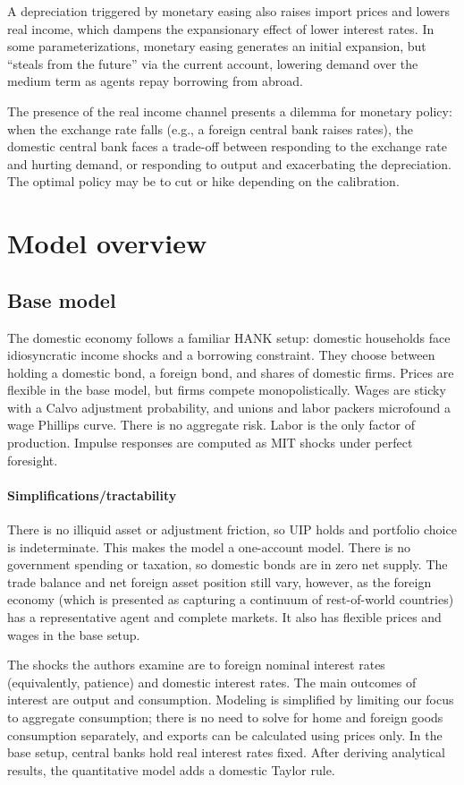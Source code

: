 \documentclass[12pt]{article}
\begin{document}
A depreciation triggered by monetary easing also raises import prices and lowers real income, which dampens the expansionary effect of lower interest rates. In some parameterizations, monetary easing generates an initial expansion, but \enquote{steals from the future} via the current account, lowering demand over the medium term as agents repay borrowing from abroad.

The presence of the real income channel presents a dilemma for monetary policy: when the exchange rate falls (e.g., a foreign central bank raises rates), the domestic central bank faces a trade-off between responding to the exchange rate and hurting demand, or responding to output and exacerbating the depreciation. The optimal policy may be to cut or hike depending on the calibration.

\section{Model overview}
\subsection{Base model}
The domestic economy follows a familiar HANK setup: domestic households face idiosyncratic income shocks and a borrowing constraint. They choose between holding a domestic bond, a foreign bond, and shares of domestic firms. Prices are flexible in the base model, but firms compete monopolistically. Wages are sticky with a Calvo adjustment probability, and unions and labor packers microfound a wage Phillips curve. There is no aggregate risk. Labor is the only factor of production. Impulse responses are computed as MIT shocks under perfect foresight.

\paragraph{Simplifications/tractability}
There is no illiquid asset or adjustment friction, so UIP holds and portfolio choice is indeterminate. This makes the model a one-account model. There is no government spending or taxation, so domestic bonds are in zero net supply. The trade balance and net foreign asset position still vary, however, as the foreign economy (which is presented as capturing a continuum of rest-of-world countries) has a representative agent and complete markets. It also has flexible prices and wages in the base setup.

The shocks the authors examine are to foreign nominal interest rates (equivalently, patience) and domestic interest rates. The main outcomes of interest are output and consumption. Modeling is simplified by limiting our focus to aggregate consumption; there is no need to solve for home and foreign goods consumption separately, and exports can be calculated using prices only. In the base setup, central banks hold real interest rates fixed. After deriving analytical results, the quantitative model adds a domestic Taylor rule.
\end{document}
